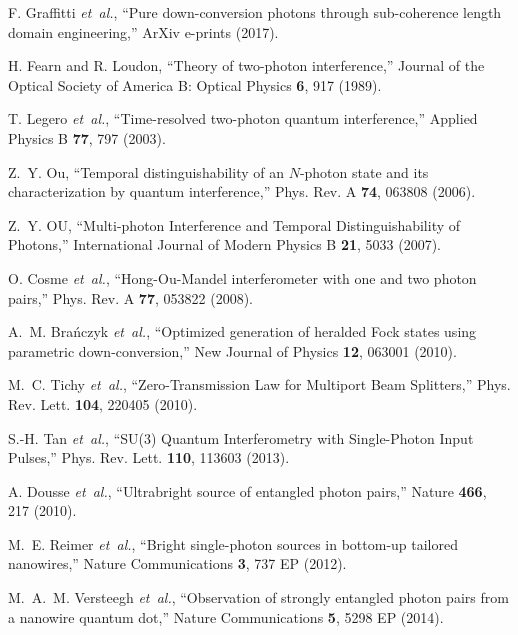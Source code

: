 \documentclass[12pt]{article}
\begin{document}
\begin{thebibliography}{10}
F. {Graffitti} {\it et~al.}, ``{Pure down-conversion photons through
  sub-coherence length domain engineering},'' ArXiv e-prints  (2017).

H. Fearn and R. Loudon, ``Theory of two-photon interference,'' Journal of the
  Optical Society of America B: Optical Physics {\bf 6}, 917 (1989).

T. Legero {\it et~al.}, ``Time-resolved two-photon quantum interference,''
  Applied Physics B {\bf 77}, 797 (2003).

Z.~Y. Ou, ``Temporal distinguishability of an $N$-photon state and its
  characterization by quantum interference,'' Phys. Rev. A {\bf 74}, 063808
  (2006).

Z.~Y. OU, ``Multi-photon Interference and Temporal Distinguishability of
  Photons,'' International Journal of Modern Physics B {\bf 21}, 5033 (2007).

O. Cosme {\it et~al.}, ``Hong-Ou-Mandel interferometer with one and two photon
  pairs,'' Phys. Rev. A {\bf 77}, 053822 (2008).

A.~M. Bra{\'n}czyk {\it et~al.}, ``Optimized generation of heralded Fock states
  using parametric down-conversion,'' New Journal of Physics {\bf 12}, 063001
  (2010).

M.~C. Tichy {\it et~al.}, ``Zero-Transmission Law for Multiport Beam
  Splitters,'' Phys. Rev. Lett. {\bf 104}, 220405 (2010).

S.-H. Tan {\it et~al.}, ``SU(3) Quantum Interferometry with Single-Photon Input
  Pulses,'' Phys. Rev. Lett. {\bf 110}, 113603 (2013).

A. Dousse {\it et~al.}, ``Ultrabright source of entangled photon pairs,''
  Nature {\bf 466}, 217 (2010).

M.~E. Reimer {\it et~al.}, ``Bright single-photon sources in bottom-up tailored
  nanowires,'' Nature Communications {\bf 3}, 737 EP  (2012).

M.~A.~M. Versteegh {\it et~al.}, ``Observation of strongly entangled photon
  pairs from a nanowire quantum dot,'' Nature Communications {\bf 5}, 5298 EP
  (2014).

\end{thebibliography}
\end{document}
